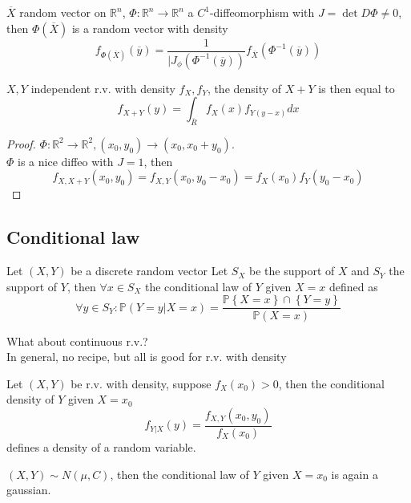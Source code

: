 \documentclass[../main.tex]{subfiles}
\begin{document}
\begin{propo}
$\overline{X}$ random vector on $ \mathbb{R}^n$, $\Phi: \mathbb{R}^n\to \mathbb{R}^n$ a $C^{1}$-diffeomorphism with $J = \det D\Phi\neq 0$, then $\Phi( \overline{X}) $ is a random vector with density
\[ 
f_{\Phi( \overline{X}) }( \overline{y})  = \frac{1}{|J_{\phi} ( \Phi^{-1}( \overline{y}) ) } f_{\overline{X}} ( \Phi^{-1}( \overline{y}) ) 
\]

\end{propo}
\begin{crly}
$X,Y$ independent r.v. with density $f_X, f_Y$, the density of $X+Y$ is then equal to
\[ 
f_{X+Y} ( y) = \int_{\overline{R}} f_X(x) f_{Y( y-x) } dx	
\]
\end{crly}
\begin{proof}
$\Phi: \mathbb{R}^{2}\to \mathbb{R}^{2}, ( x_0,y_0) \to ( x_0,x_0+y_0) $.\\
$\Phi$ is a nice diffeo with $J=1$, then
\[ 
f_{X,X+Y} ( x_0,y_0) = f_{X,Y} ( x_0,y_0-x_0) = f_X( x_0) f_Y( y_0-x_0)
\]

\end{proof}
\subsection{Conditional law}
\begin{defn}
	Let $( X,Y) $ be a discrete random vector
	Let $S_X$ be the support of $X$ and $S_Y$ the support of $Y$, then $\forall x \in S_X$ the conditional law of $Y$ given $X=x$ defined as
	\[ 
	\forall y \in S_Y: \mathbb{P}( Y=y|X=x) = \frac{ \mathbb{P} \left\{ X=x \right\} \cap \left\{ Y=y \right\} }{ \mathbb{P}( X=x) }
	\]
	
	
\end{defn}
What about continuous r.v.?\\
In general, no recipe, but all is good for r.v. with density
\begin{defn}
	Let $( X,Y) $ be r.v. with density, suppose $f_X( x_0) >0$, then the conditional density of $Y$ given $X=x_0$ 
	\[ 
	f_{Y|X} ( y) = \frac{ f_{X,Y} ( x_0,y_0) }{ f_X( x_0) }		
	\]
defines a density of a random variable.	
\end{defn}
\begin{lemma}
$ ( X,Y) \sim N( \mu, C) $, then the conditional law of $Y$ given $X=x_0$ is again a gaussian.
\end{lemma}
\end{document}
